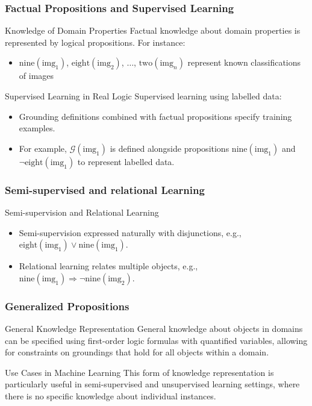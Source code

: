 \documentclass{beamer}
\newcommand{\G}{\mathcal{G}}
\begin{document}
\begin{frame}
\frametitle{Factual Propositions and Supervised Learning}
\begin{block}{Knowledge of Domain Properties}
Factual knowledge about domain properties is represented by logical propositions. For instance:
\begin{itemize}
    \item \( \text{nine}(\text{img}_1) \), \( \text{eight}(\text{img}_2) \), \( \ldots \), \( \text{two}(\text{img}_n) \) represent known classifications of images
\end{itemize}
\end{block}

\begin{block}{Supervised Learning in Real Logic}
Supervised learning using labelled data:
\begin{itemize}
    \item Grounding definitions combined with factual propositions specify training examples.
    \item For example, \( \G(\text{img}_1) \) is defined alongside propositions \( \text{nine}(\text{img}_1) \) and \( \neg\text{eight}(\text{img}_1) \) to represent labelled data.
\end{itemize}
\end{block}
\end{frame}


\begin{frame}
\frametitle{Semi-supervised and relational Learning}
\begin{block}{Semi-supervision and Relational Learning}
\begin{itemize}
    \item Semi-supervision expressed naturally with disjunctions, e.g., \( \text{eight}(\text{img}_1) \lor \text{nine}(\text{img}_1) \).
    \item Relational learning relates multiple objects, e.g., \( \text{nine}(\text{img}_1) \Rightarrow \neg\text{nine}(\text{img}_2) \).
\end{itemize}
\end{block}

\end{frame}

\begin{frame}
\frametitle{Generalized Propositions}
\begin{block}{General Knowledge Representation}
General knowledge about objects in domains can be specified using first-order logic formulas with quantified variables, allowing for constraints on groundings that hold for all objects within a domain.
\end{block}

\begin{block}{Use Cases in Machine Learning}
This form of knowledge representation is particularly useful in semi-supervised and unsupervised learning settings, where there is no specific knowledge about individual instances.
\end{block}
\end{frame}
\end{document}
